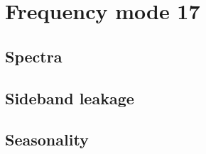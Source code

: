 \section{Frequency mode 17}
\label{FM17}

\subsection{Spectra}
\label{FM17:spectra}

\subsection{Sideband leakage}
\label{FM17:sbl}

\subsection{Seasonality}
\label{FM17:seasonailty}
